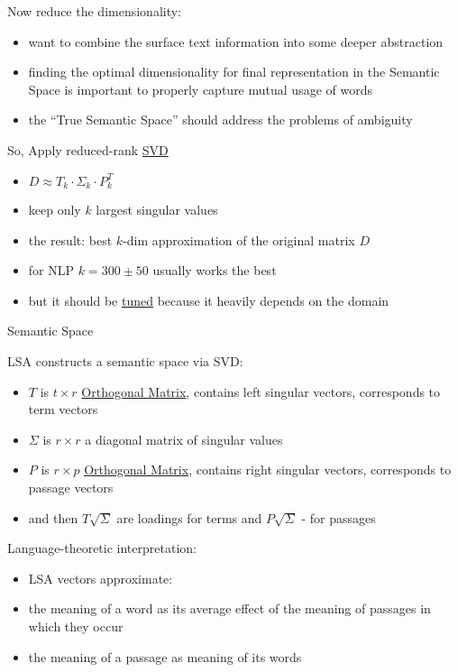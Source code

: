 Now reduce the dimensionality:

\begin{itemize}
\itemsep1pt\parskip0pt
\item
  want to combine the surface text information into some deeper
  abstraction
\item
  finding the optimal dimensionality for final representation in the
  Semantic Space is important to properly capture mutual usage of words
\item
  the ``True Semantic Space'' should address the problems of ambiguity
\end{itemize}

So, Apply reduced-rank \url{SVD}

\begin{itemize}
\itemsep1pt\parskip0pt
\item
  $D \approx T_k \cdot
  \Sigma_k \cdot P^T_k$
\item
  keep only $k$ largest singular values
\item
  the result: best $k$-dim approximation of the original matrix $D$
\item
  for NLP $k = 300 \pm 50$ usually works the best
\item
  but it should be \href{Parameter Tuning}{tuned} because it heavily
  depends on the domain
\end{itemize}

Semantic Space

LSA constructs a semantic space via SVD:

\begin{itemize}
\itemsep1pt\parskip0pt
\item
  $T$ is $t \times r$
  \href{Orthogonal Matrix}{Orthogonal Matrix}, contains left singular
  vectors, corresponds to term vectors
\item
  $\Sigma$ is $r \times r$ a diagonal
  matrix of singular values
\item
  $P$ is $r \times p$
  \href{Orthogonal Matrix}{Orthogonal Matrix}, contains right singular
  vectors, corresponds to passage vectors
\item
  and then $T \sqrt\Sigma$ are loadings
  for terms and $P \sqrt\Sigma$ - for
  passages
\end{itemize}

Language-theoretic interpretation:

\begin{itemize}
\itemsep1pt\parskip0pt
\item
  LSA vectors approximate:
\item
  the meaning of a word as its average effect of the meaning of passages
  in which they occur
\item
  the meaning of a passage as meaning of its words
\end{itemize}

